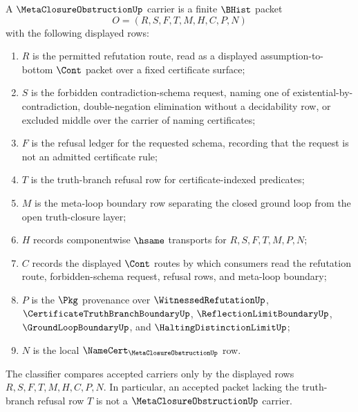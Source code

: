 \begin{definition}
\label{def:meta-closure-obstruction-carrier}
A $\MetaClosureObstructionUp$ carrier is a finite $\BHist$ packet
$$
O=(R,S,F,T,M,H,C,P,N)
$$
with the following displayed rows:
\begin{enumerate}
\item $R$ is the permitted refutation route, read as a displayed assumption-to-bottom $\Cont$ packet over a fixed certificate surface;
\item $S$ is the forbidden contradiction-schema request, naming one of existential-by-contradiction, double-negation elimination without a decidability row, or excluded middle over the carrier of naming certificates;
\item $F$ is the refusal ledger for the requested schema, recording that the request is not an admitted certificate rule;
\item $T$ is the truth-branch refusal row for certificate-indexed predicates;
\item $M$ is the meta-loop boundary row separating the closed ground loop from the open truth-closure layer;
\item $H$ records componentwise $\hsame$ transports for $R,S,F,T,M,P,N$;
\item $C$ records the displayed $\Cont$ routes by which consumers read the refutation route, forbidden-schema request, refusal rows, and meta-loop boundary;
\item $P$ is the $\Pkg$ provenance over $\WitnessedRefutationUp$, $\CertificateTruthBranchBoundaryUp$, $\ReflectionLimitBoundaryUp$, $\GroundLoopBoundaryUp$, and $\HaltingDistinctionLimitUp$;
\item $N$ is the local $\NameCert_{\MetaClosureObstructionUp}$ row.
\end{enumerate}
The classifier compares accepted carriers only by the displayed rows $R,S,F,T,M,H,C,P,N$. In particular, an accepted packet lacking the truth-branch refusal row $T$ is not a $\MetaClosureObstructionUp$ carrier.
\end{definition}

